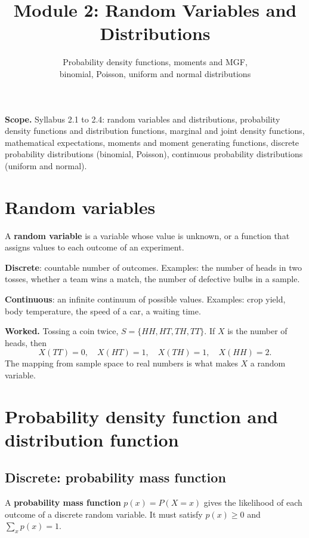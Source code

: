\documentclass[11pt,a4paper]{article}
\title{\textbf{Module 2: Random Variables and Distributions}\\}
\author{\large Probability density functions, moments and MGF,\\binomial, Poisson, uniform and normal distributions}
\date{}
\begin{document}
\maketitle

\begin{exambox}
\textbf{Scope.} Syllabus 2.1 to 2.4: random variables and distributions, probability density functions and distribution functions, marginal and joint density functions, mathematical expectations, moments and moment generating functions, discrete probability distributions (binomial, Poisson), continuous probability distributions (uniform and normal).
\end{exambox}

\tableofcontents
\newpage

\section{Random variables}

A \textbf{random variable} is a variable whose value is unknown, or a function that assigns values to each outcome of an experiment.

\textbf{Discrete}: countable number of outcomes. Examples: the number of heads in two tosses, whether a team wins a match, the number of defective bulbs in a sample.

\textbf{Continuous}: an infinite continuum of possible values. Examples: crop yield, body temperature, the speed of a car, a waiting time.

\begin{exambox}
\textbf{Worked.} Tossing a coin twice, $S=\{HH,HT,TH,TT\}$. If $X$ is the number of heads, then
\[
X(TT)=0,\quad X(HT)=1,\quad X(TH)=1,\quad X(HH)=2.
\]
The mapping from sample space to real numbers is what makes $X$ a random variable.
\end{exambox}

\section{Probability density function and distribution function}

\subsection{Discrete: probability mass function}
A \textbf{probability mass function} $p(x)=P(X=x)$ gives the likelihood of each outcome of a discrete random variable. It must satisfy $p(x)\ge 0$ and $\sum_x p(x)=1$.
\end{document}
